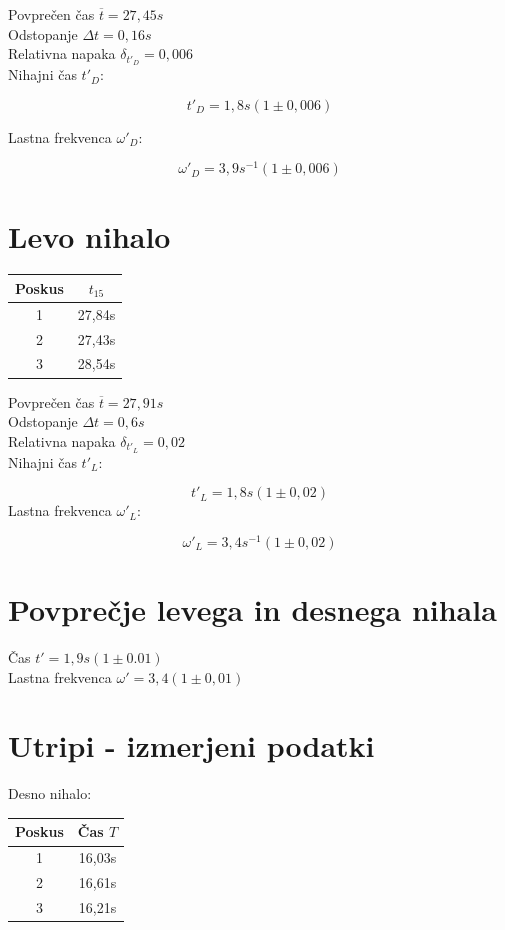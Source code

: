 \documentclass[a4paper]{report}
\begin{document}
\noindent Povprečen čas $\overline t = 27,45s$ \\
Odstopanje $\Delta t = 0,16s$ \\
Relativna napaka $\delta_{t'_D} = 0,006$ \\
Nihajni čas $t'_D$:

\[
  t'_D = 1,8s (1 \pm 0,006)
\]

\noindent Lastna frekvenca $\omega'_D$:

\[
  \omega'_D = 3,9s^{-1} (1 \pm 0,006)
\]


\section*{Levo nihalo}

\begin{center}
  \begin{tabular}{| c | c |}
    \hline
    Poskus & $t_{15}$ \\ \hline
    1 & 27,84s \\ \hline
    2 & 27,43s \\ \hline
    3 & 28,54s \\
    \hline
  \end{tabular}
\end{center}

\noindent Povprečen čas $\overline t = 27,91s$ \\
Odstopanje $\Delta t = 0,6s$ \\
Relativna napaka $\delta_{t'_L} = 0,02$ \\
Nihajni čas $t'_L$:

\[
  t'_L = 1,8s (1 \pm 0,02)
\]
\noindent Lastna frekvenca $\omega'_L$:

\[
  \omega'_L = 3,4s^{-1} (1 \pm 0,02)
\]

\section*{Povprečje levega in desnega nihala}

Čas $t' = 1,9s(1 \pm 0.01)$ \\
Lastna frekvenca $\omega' = 3,4 (1 \pm 0,01)$
  
    
\section*{Utripi - izmerjeni podatki}

 Desno nihalo:

\begin{center}
  \begin{tabular}{| c | c |}
    \hline
    Poskus & Čas $T$ \\ \hline
    1 & 16,03s \\ \hline
    2 & 16,61s \\ \hline
    3 & 16,21s \\
    \hline
  \end{tabular}
\end{center}
\end{document}

